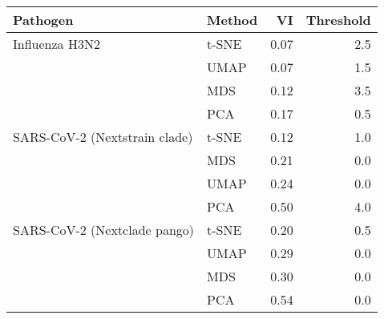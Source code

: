 \begin{tabular}{llrr}
\toprule
                     Pathogen & Method &   VI &  Threshold \\
\midrule
               Influenza H3N2 &  t-SNE & 0.07 &        2.5 \\
                              &   UMAP & 0.07 &        1.5 \\
                              &    MDS & 0.12 &        3.5 \\
                              &    PCA & 0.17 &        0.5 \\
SARS-CoV-2 (Nextstrain clade) &  t-SNE & 0.12 &        1.0 \\
                              &    MDS & 0.21 &        0.0 \\
                              &   UMAP & 0.24 &        0.0 \\
                              &    PCA & 0.50 &        4.0 \\
 SARS-CoV-2 (Nextclade pango) &  t-SNE & 0.20 &        0.5 \\
                              &   UMAP & 0.29 &        0.0 \\
                              &    MDS & 0.30 &        0.0 \\
                              &    PCA & 0.54 &        0.0 \\
\bottomrule
\end{tabular}
